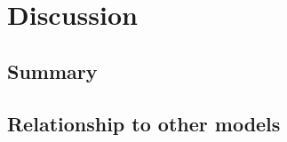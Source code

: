 \documentclass[10pt,letterpaper]{article}
\theoremstyle{plain}
\theoremstyle{remark}
\begin{document}



\section{Discussion}

\subsection{Summary}


\subsection{Relationship to other models}

\end{document}
